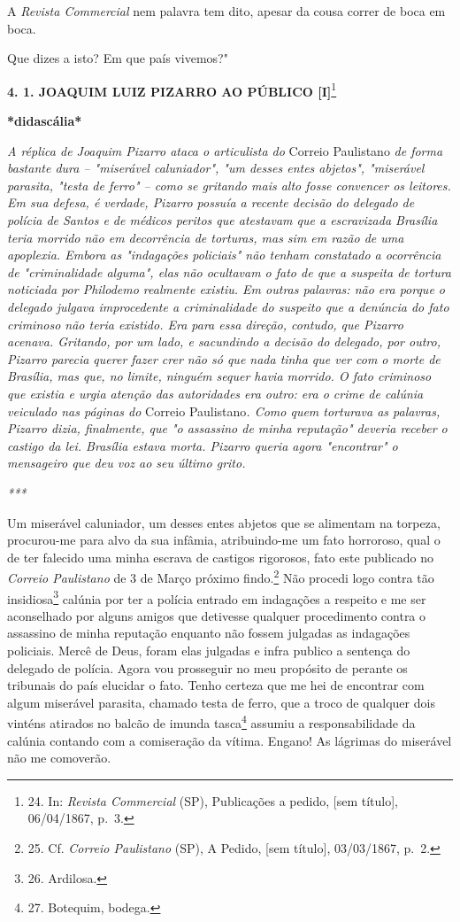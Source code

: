 A \emph{Revista Commercial} nem palavra tem dito, apesar da cousa correr
de boca em boca.

Que dizes a isto? Em que país vivemos?"

\textbf{4. 1. JOAQUIM LUIZ PIZARRO AO PÚBLICO {[}I{]}}\footnote{24. In:
  \emph{Revista Commercial} (SP), Publicações a pedido, {[}sem
  título{]}, 06/04/1867, p.~3.}

\textbf{*didascália*}

\emph{A réplica de Joaquim Pizarro ataca o articulista do} Correio
Paulistano \emph{de forma bastante dura -- "miserável caluniador", "um
desses entes abjetos", "miserável parasita, "testa de ferro" -- como se
gritando mais alto fosse convencer os leitores. Em sua defesa, é
verdade, Pizarro possuía a recente decisão do delegado de polícia de
Santos e de médicos peritos que atestavam que a escravizada Brasília
teria morrido não em decorrência de torturas, mas sim em razão de uma
apoplexia. Embora as "indagações policiais" não tenham constatado a
ocorrência de "criminalidade alguma", elas não ocultavam o fato de que a
suspeita de tortura noticiada por Philodemo realmente existiu. Em outras
palavras: não era porque o delegado julgava improcedente a criminalidade
do suspeito que a denúncia do fato criminoso não teria existido. Era
para essa direção, contudo, que Pizarro acenava. Gritando, por um lado,
e sacundindo a decisão do delegado, por outro, Pizarro parecia querer
fazer crer não só que nada tinha que ver com o morte de Brasília, mas
que, no limite, ninguém sequer havia morrido. O fato criminoso que
existia e urgia atenção das autoridades era outro: era o crime de
calúnia veiculado nas páginas do} Correio Paulistano\emph{. Como quem
torturava as palavras, Pizarro dizia, finalmente, que "o assassino de
minha reputação" deveria receber o castigo da lei. Brasília estava
morta. Pizarro queria agora "encontrar" o mensageiro que deu voz ao seu
último grito.}

\emph{***}

Um miserável caluniador, um desses entes abjetos que se alimentam na
torpeza, procurou-me para alvo da sua infâmia, atribuindo-me um fato
horroroso, qual o de ter falecido uma minha escrava de castigos
rigorosos, fato este publicado no \emph{Correio Paulistano} de 3 de
Março próximo findo.\footnote{25. Cf. \emph{Correio Paulistano} (SP), A
  Pedido, {[}sem título{]}, 03/03/1867, p.~2.} Não procedi logo contra
tão insidiosa\textsuperscript{⁠}\footnote{26. Ardilosa.} calúnia por ter
a polícia entrado em indagações a respeito e me ser aconselhado por
alguns amigos que detivesse qualquer procedimento contra o assassino de
minha reputação enquanto não fossem julgadas as indagações policiais.
Mercê de Deus, foram elas julgadas e infra publico a sentença do
delegado de polícia. Agora vou prosseguir no meu propósito de perante os
tribunais do país elucidar o fato. Tenho certeza que me hei de encontrar
com algum miserável parasita, chamado testa de ferro, que a troco de
qualquer dois vinténs atirados no balcão de imunda
tasca\textsuperscript{⁠}\footnote{27. Botequim, bodega.} assumiu a
responsabilidade da calúnia contando com a comiseração da vítima.
Engano! As lágrimas do miserável não me comoverão.


